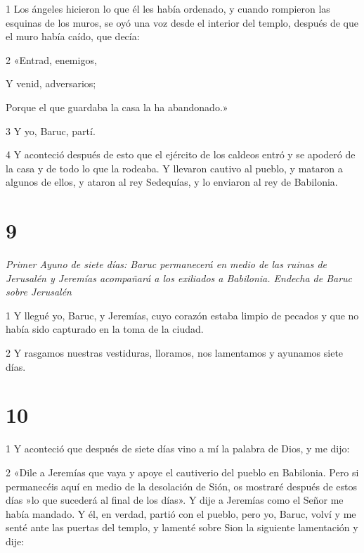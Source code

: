 \par 1 Los ángeles hicieron lo que él les había ordenado, y cuando rompieron las esquinas de los muros, se oyó una voz desde el interior del templo, después de que el muro había caído, que decía:

\par 2 «Entrad, enemigos,

\par Y venid, adversarios;

\par Porque el que guardaba la casa la ha abandonado.»

\par 3 Y yo, Baruc, partí.

\par 4 Y aconteció después de esto que el ejército de los caldeos entró y se apoderó de la casa y de todo lo que la rodeaba. Y llevaron cautivo al pueblo, y mataron a algunos de ellos, y ataron al rey Sedequías, y lo enviaron al rey de Babilonia.

\chapter{9}

\par \textit{Primer Ayuno de siete días: Baruc permanecerá en medio de las ruinas de Jerusalén y Jeremías acompañará a los exiliados a Babilonia. Endecha de Baruc sobre Jerusalén}

\par 1 Y llegué yo, Baruc, y Jeremías, cuyo corazón estaba limpio de pecados y que no había sido capturado en la toma de la ciudad.

\par 2 Y rasgamos nuestras vestiduras, lloramos, nos lamentamos y ayunamos siete días.

\chapter{10}

\par 1 Y aconteció que después de siete días vino a mí la palabra de Dios, y me dijo:

\par 2 «Dile a Jeremías que vaya y apoye el cautiverio del pueblo en Babilonia. Pero si permanecéis aquí en medio de la desolación de Sión, os mostraré después de estos días »lo que sucederá al final de los días». Y dije a Jeremías como el Señor me había mandado. Y él, en verdad, partió con el pueblo, pero yo, Baruc, volví y me senté ante las puertas del templo, y lamenté sobre Sion la siguiente lamentación y dije:

